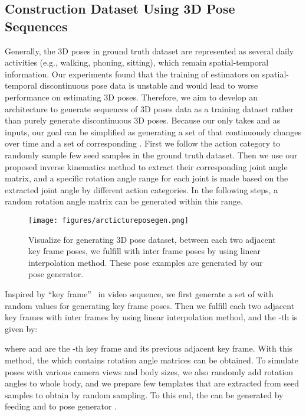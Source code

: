 \documentclass[runningheads]{llncs}
\begin{document}
\subsection{Construction Dataset Using 3D Pose Sequences} 
Generally, the 3D poses in ground truth dataset are represented as several daily activities (e.g., walking, phoning, sitting), which remain spatial-temporal information. 
Our experiments found that the training of estimators on spatial-temporal discontinuous pose data is unstable and would lead to worse performance on estimating 3D poses. 
Therefore, we aim to develop an architecture to generate sequences of 3D poses data as a training dataset rather than purely generate discontinuous 3D poses. 
Because our  only takes  and  as inputs, our goal can be simplified as generating a set of  that continuously changes over time and a set of corresponding . 
First we follow the action category to randomly sample few seed samples in the ground truth dataset. 
Then we use our proposed inverse kinematics method to extract their corresponding joint angle matrix, and a specific rotation angle range for each joint is made based on the extracted joint angle by different action categories. 
In the following steps, a random rotation angle matrix can be generated within this range. 

\begin{figure}[h]
    \centering
    \texttt{[image: figures/arctictureposegen.png]}
    \caption{Visualize for generating 3D pose dataset, between each two adjacent key frame poses, we fulfill with  inter frame poses by using linear interpolation method. These pose examples are generated by our pose generator.}
    \label{fig:posearcticture}
\end{figure}

Inspired by ``key frame''~\cite{keyframe} in video sequence, we first generate a set of  with random values for generating  key frame poses. 
Then we fulfill each two adjacent key frames with  inter frames by using linear interpolation method, and the -th  is given by:



where  and  are the -th key frame and its previous adjacent key frame. 
With this method, the  which contains  rotation angle matrices can be obtained. 
To simulate poses with various camera views and body sizes, we also randomly add rotation angles to whole body, and we prepare few  templates that are extracted from seed samples to obtain  by random sampling. To this end, the  can be generated by feeding  and  to pose generator .
\end{document}
